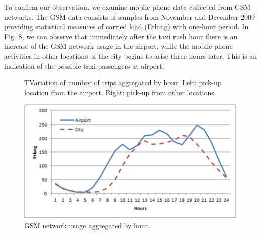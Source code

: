 \documentclass[a4paper, 10pt, conference]{ieeeconf}      %
\begin{document}
To confirm our observation, we examine mobile phone data collected from GSM networks. The GSM data consists of samples from November and December 2009 providing statistical measures of carried load (Erlang) with one-hour period. In Fig. 8, we can observe that immediately after the taxi rush hour there is an increase of the GSM network usage in the airport, while the mobile phone activities in other locations of the city begins to arise three hours later. This is an indication of the possible taxi passengers at airport. 

\begin{figure}[htbp]
    \centering

    \caption{ TVariation of number of trips aggregated by hour. Left:  pick-up location from the airport. Right: pick-up from other locations. }
    \label{fig:my_png_7}
\end{figure}

\begin{figure}[htbp]
    \centering
    \includegraphics{fig/png8.png}
    \caption{GSM network usage aggregated by hour. }
    \label{fig:my_png_8}
\end{figure}

\end{document}
